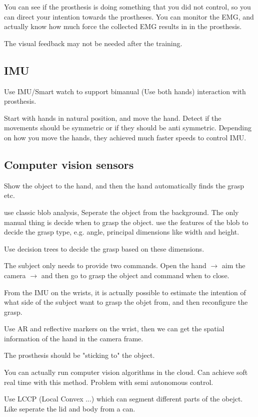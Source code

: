 \documentclass[a4paper]{article}
\begin{document}
You can see if the prosthesis is doing something that you did not control, so you can direct your intention towards the prostheses. You can monitor the EMG, and actually know how much force the collected EMG results in in the prosthesis. 

The visual feedback may not be needed after the training. 

\subsection{IMU}
Use IMU/Smart watch to support bimanual (Use both hands) interaction with prosthesis.

Start with hands in natural position, and move the hand. Detect if the movements should be symmetric or if they should be anti symmetric. Depending on how you move the hands, they achieved much faster speeds to control IMU.

\subsection{Computer vision sensors}
Show the object to the hand, and then the hand automatically finds the grasp etc. 

use classic blob analysis, Seperate the object from the background.
The only manual thing is decide when to grasp the object. 
use the features of the blob to decide the grasp type, e.g. angle, principal dimensions like width and height. 

Use decision trees to decide the grasp based on these dimensions. 

The subject only needs to provide two commands. Open the hand $ \rightarrow $ aim the camera $ \rightarrow $ and then go to grasp the object and command when to close. 

From the IMU on the wrists, it is actually possible to estimate the intention of what side of the subject want to grasp the objet from, and then reconfigure the grasp. 

Use AR and reflective markers on the wrist, then we can get the spatial information of the hand in the camera frame. 


The prosthesis should be "sticking to" the object. 

You can actually run computer vision algorithms in the cloud. Can achieve soft real time with this method. Problem with semi autonomous control. 

Use LCCP (Local Convex ...) which can segment different parts of the obejct. Like seperate the lid and body from a can. 
\end{document}
